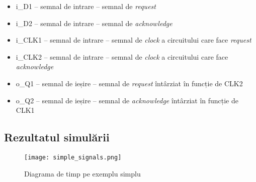 \documentclass[../main.tex]{subfiles}
\begin{document}
\begin{itemize}
    \item i\_D1 -- semnal de intrare -- semnal de \emph{request}
    \item i\_D2 -- semnal de intrare -- semnal de \emph{acknowledge}
    \item i\_CLK1 -- semnal de intrare -- semnal de \emph{clock} a circuitului care face \emph{request}
    \item i\_CLK2 -- semnal de intrare -- semnal de \emph{clock} a circuitului care face \emph{acknowledge}
    \item o\_Q1 -- semnal de ieșire -- semnal de \emph{request} întârziat în funcție de CLK2
    \item o\_Q2 -- semnal de ieșire -- semnal de \emph{acknowledge} întârziat în funcție de CLK1
\end{itemize}

\subsection{Rezultatul simulării}

\begin{figure}[h]
    \centering
    \texttt{[image: simple\_signals.png]}
    \caption{Diagrama de timp pe exemplu simplu}
    \label{fig:simple_signals}
\end{figure}
\end{document}
